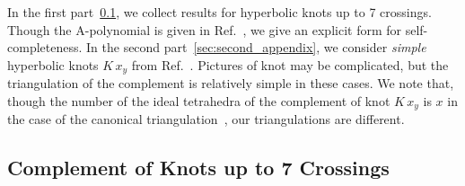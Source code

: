 \documentclass[12pt,reqno]{amsart}
\numberwithin{equation}{section}
\begin{document}
In the first part~\ref{sec:first_appendix}, we collect results
for hyperbolic knots up to 7
crossings.
Though the A-polynomial is given in Ref.~, we give an
explicit form for self-completeness.
In the second part~\ref{sec:second_appendix}, we consider
\emph{simple} hyperbolic knots $K \,x_y$ from
Ref.~.
Pictures of knot may be complicated, but the triangulation of the
complement is relatively simple in these cases.
We note that,
though
the number of the ideal tetrahedra of the
complement of knot $K \, x_y$ is $x$ in the case of the canonical
triangulation~\cite{SnapPea99},  our triangulations are different.



\subsection{Complement of Knots up to 7 Crossings}
\label{sec:first_appendix}


\end{document}
